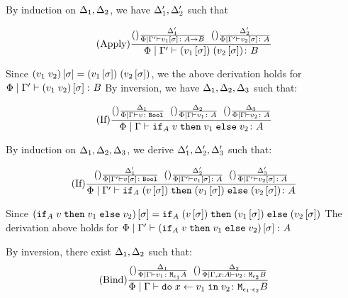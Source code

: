 {        By induction on $\Delta_1, \Delta_2$, we have $\Delta_1',\Delta_2'$ such that

        \begin{equation}
            (\text{Apply}) \frac{
                (\text{}) \frac{\Delta'_1}{\Phi\mid\Gamma' \vdash v_1\left[\sigma\right] \colon A\rightarrow B}
                \;\;
                (\text{}) \frac{\Delta_2'}{\Phi\mid\Gamma' \vdash v_2\left[\sigma\right] \colon A}
            }{\Phi\mid\Gamma' \vdash (v_1\left[\sigma\right])\;(v_2\left[\sigma\right]) \colon B}
        \end{equation}

        Since $(v_1\; v_2)\left[\sigma\right] = (v_1\left[\sigma\right])\;(v_2\left[\sigma\right])$, we the above derivation holds for $\Phi\mid\Gamma' \vdash (v_1\; v_2)\left[\sigma\right] \colon B$
        By inversion, we have $\Delta_1,\Delta_2,\Delta_3$ such that:

        \begin{equation}
            (\text{If}) \frac{
                (\text{}) \frac{\Delta_1}{\Phi\mid\Gamma \vdash v \colon \texttt{Bool}}
                \;\;
                (\text{}) \frac{\Delta_2}{\Phi\mid\Gamma \vdash v_1 \colon A}
                \;\;
                (\text{}) \frac{\Delta_3}{\Phi\mid\Gamma \vdash v_2 \colon A}
            }{
                \Phi\mid\Gamma \vdash \texttt{if}_{A}\; v\; \texttt{then}\; v_1 \;\texttt{else} \; v_2 \colon A
            }
        \end{equation}

        By induction on $\Delta_1,\Delta_2, \Delta_3$, we derive 
        $\Delta_1', \Delta_2',\Delta_3'$ such that:
        
        \begin{equation}
            (\text{If}) \frac{
                (\text{}) \frac{\Delta_1'}{\Phi\mid\Gamma' \vdash v\left[\sigma\right] \colon \texttt{Bool}}
                \;\;
                (\text{}) \frac{\Delta_2'}{\Phi\mid\Gamma' \vdash v_1\left[\sigma\right] \colon A}
                \;\;
                (\text{}) \frac{\Delta_3'}{\Phi\mid\Gamma' \vdash v_2\left[\sigma\right] \colon A}
            }{
                \Phi\mid\Gamma' \vdash \texttt{if}_{A}\;(v\left[\sigma\right])\; \texttt{then}\; (v_1\left[\sigma\right]) \;\texttt{else} \;(v_2\left[\sigma\right]) \colon A
            }
        \end{equation}

        Since $(\texttt{if}_{A}\; v\; \texttt{then}\; v_1 \;\texttt{else} \; v_2)\left[\sigma\right] = \texttt{if}_{A}\;(v\left[\sigma\right])\; \texttt{then}\; (v_1\left[\sigma\right]) \;\texttt{else} \;(v_2\left[\sigma\right])$ The derivation above holds for $\Phi\mid\Gamma' \vdash (\texttt{if}_{A}\; v\; \texttt{then}\; v_1 \;\texttt{else} \; v_2)\left[\sigma\right] \colon A$

        By inversion, there exist $\Delta_1, \Delta_2$ such that:
        \begin{equation}
            (\text{Bind}) \frac{
                (\text{}) \frac{\Delta_1}{\Phi\mid\Gamma \vdash v_1 \colon \texttt{M}_{\epsilon_1}{A}}
                \;\;
                (\text{}) \frac{\Delta_2}{\Phi\mid\Gamma, x:A \vdash v_2 \colon \texttt{M}_{\epsilon_2}{B}}
            }{\Phi\mid\Gamma \vdash \texttt{do}\; x \leftarrow v_1 \;\texttt{in}\; v_2 \colon \texttt{M}_{\epsilon_1\cdot\epsilon_2}{B}}
        \end{equation}

}
